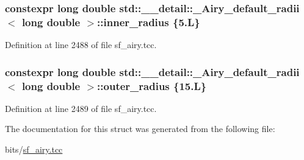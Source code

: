 \subsubsection[{\texorpdfstring{inner\+\_\+radius}{inner_radius}}]{\setlength{\rightskip}{0pt plus 5cm}constexpr long double {\bf std\+::\+\_\+\+\_\+detail\+::\+\_\+\+Airy\+\_\+default\+\_\+radii}$<$ long double $>$\+::inner\+\_\+radius \{5.\+L\}\hspace{0.3cm}{\ttfamily [static]}}\hypertarget{structstd_1_1____detail_1_1__Airy__default__radii_3_01long_01double_01_4_a59d4d304728aa4ac3669fc967a9e69a9}{}\label{structstd_1_1____detail_1_1__Airy__default__radii_3_01long_01double_01_4_a59d4d304728aa4ac3669fc967a9e69a9}


Definition at line 2488 of file sf\+\_\+airy.\+tcc.

\subsubsection[{\texorpdfstring{outer\+\_\+radius}{outer_radius}}]{\setlength{\rightskip}{0pt plus 5cm}constexpr long double {\bf std\+::\+\_\+\+\_\+detail\+::\+\_\+\+Airy\+\_\+default\+\_\+radii}$<$ long double $>$\+::outer\+\_\+radius \{15.\+L\}\hspace{0.3cm}{\ttfamily [static]}}\hypertarget{structstd_1_1____detail_1_1__Airy__default__radii_3_01long_01double_01_4_ab46784c2c76dc0f43aeb85d22f8b21a7}{}\label{structstd_1_1____detail_1_1__Airy__default__radii_3_01long_01double_01_4_ab46784c2c76dc0f43aeb85d22f8b21a7}


Definition at line 2489 of file sf\+\_\+airy.\+tcc.



The documentation for this struct was generated from the following file\+:\begin{DoxyCompactItemize}
\item 
bits/\hyperlink{sf__airy_8tcc}{sf\+\_\+airy.\+tcc}\end{DoxyCompactItemize}
